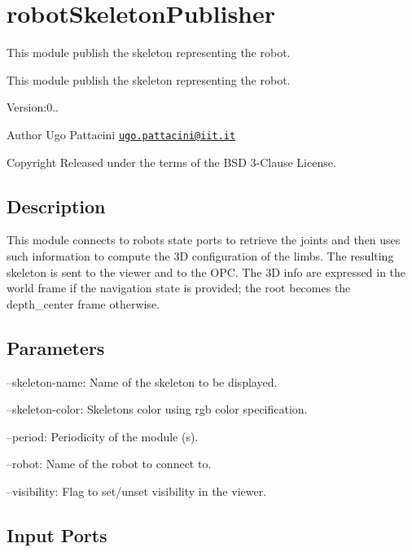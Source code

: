 \section{robot\+Skeleton\+Publisher}
\label{group__robotSkeletonPublisher}


This module publish the skeleton representing the robot.  


This module publish the skeleton representing the robot. 

Version\+:0.. \begin{DoxyAuthor}{Author}
Ugo Pattacini \href{mailto:ugo.pattacini@iit.it}{\tt ugo.\+pattacini@iit.\+it} ~\newline
 
\end{DoxyAuthor}
\begin{DoxyCopyright}{Copyright}
Released under the terms of the B\+SD 3-\/\+Clause License. 
\end{DoxyCopyright}
\hypertarget{group__skeletonViewer_intro_sec}{}\subsection{Description}\label{group__skeletonViewer_intro_sec}
This module connects to robot\textquotesingle{}s state ports to retrieve the joints and then uses such information to compute the 3D configuration of the limbs. The resulting skeleton is sent to the viewer and to the O\+PC. The 3D info are expressed in the world frame if the navigation state is provided; the root becomes the depth\+\_\+center frame otherwise.\hypertarget{group__skeletonViewer_parameters_sec}{}\subsection{Parameters}\label{group__skeletonViewer_parameters_sec}

\begin{DoxyItemize}
\item --skeleton-\/name\+: Name of the skeleton to be displayed.
\item --skeleton-\/color\+: Skeleton\textquotesingle{}s color using rgb color specification.
\item --period\+: Periodicity of the module (s).
\item --robot\+: Name of the robot to connect to.
\item --visibility\+: Flag to set/unset visibility in the viewer. 
\end{DoxyItemize}\hypertarget{group__skeletonViewer_inputports_sec}{}\subsection{Input Ports}\label{group__skeletonViewer_inputports_sec}

